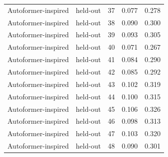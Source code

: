 \begin{tabular}{llrrr}
Autoformer-inspired & held-out & 37 & 0.077 & 0.278 \\
Autoformer-inspired & held-out & 38 & 0.090 & 0.300 \\
Autoformer-inspired & held-out & 39 & 0.093 & 0.305 \\
Autoformer-inspired & held-out & 40 & 0.071 & 0.267 \\
Autoformer-inspired & held-out & 41 & 0.084 & 0.290 \\
Autoformer-inspired & held-out & 42 & 0.085 & 0.292 \\
Autoformer-inspired & held-out & 43 & 0.102 & 0.319 \\
Autoformer-inspired & held-out & 44 & 0.100 & 0.315 \\
Autoformer-inspired & held-out & 45 & 0.106 & 0.326 \\
Autoformer-inspired & held-out & 46 & 0.098 & 0.313 \\
Autoformer-inspired & held-out & 47 & 0.103 & 0.320 \\
Autoformer-inspired & held-out & 48 & 0.090 & 0.301 \\
\bottomrule
\end{tabular}
